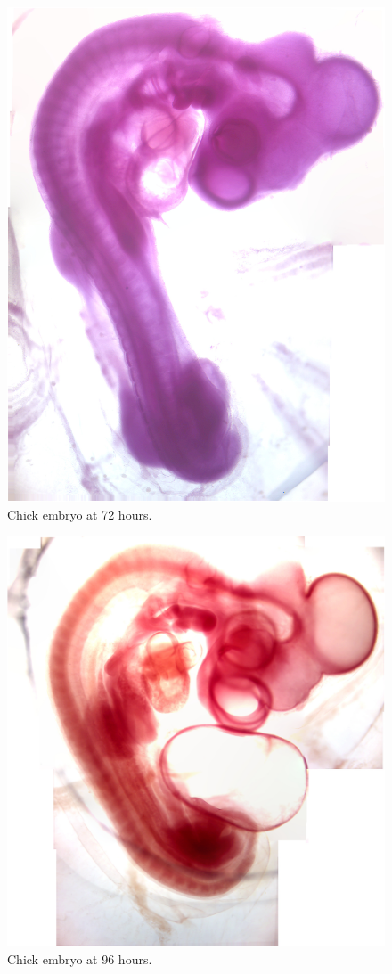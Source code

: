 \begin{figure}

{\centering \includegraphics[width=0.7\linewidth]{./figures/development/chick_72h}

}

\caption{Chick embryo at 72 hours.}\label{fig:chick72h}
\end{figure}

\begin{figure}

{\centering \includegraphics[width=0.7\linewidth]{./figures/development/chick_96h}

}

\caption{Chick embryo at 96 hours.}\label{fig:chick96h}
\end{figure}

